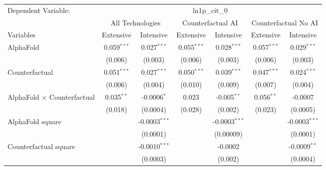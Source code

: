 \begingroup
\centering
\begin{tabular}{lcccccc}
   \tabularnewline \midrule \midrule
   Dependent Variable: & \multicolumn{6}{c}{ln1p\_cit\_0}\\
 & \multicolumn{2}{c}{All Technologies} & \multicolumn{2}{c}{Counterfactual AI} & \multicolumn{2}{c}{Counterfactual No AI} \\
\cmidrule(lr){1-1}\cmidrule(lr){2-3} \cmidrule(lr){4-5} \cmidrule(lr){6-7}
Variables & \multicolumn{1}{c}{Extensive} & \multicolumn{1}{c}{Intensive} & \multicolumn{1}{c}{Extensive} & \multicolumn{1}{c}{Intensive} & \multicolumn{1}{c}{Extensive} & \multicolumn{1}{c}{Intensive} \\
\cmidrule(lr){1-1}\cmidrule(lr){2-2} \cmidrule(lr){3-3} \cmidrule(lr){4-4} \cmidrule(lr){5-5} \cmidrule(lr){6-6} \cmidrule(lr){7-7}
   AlphaFold                          & 0.059$^{***}$ & 0.027$^{***}$     & 0.055$^{***}$ & 0.028$^{***}$   & 0.057$^{***}$ & 0.029$^{***}$\\   
                                      & (0.006)       & (0.003)           & (0.006)       & (0.003)         & (0.006)       & (0.003)\\   
   Counterfactual                     & 0.051$^{***}$ & 0.027$^{***}$     & 0.050$^{***}$ & 0.039$^{***}$   & 0.047$^{***}$ & 0.024$^{***}$\\   
                                      & (0.006)       & (0.004)           & (0.010)       & (0.009)         & (0.007)       & (0.004)\\   
   AlphaFold $\times$ Counterfactual  & 0.035$^{**}$  & -0.0006$^{*}$     & 0.023         & -0.005$^{**}$   & 0.056$^{**}$  & -0.0007\\   
                                      & (0.018)       & (0.0004)          & (0.028)       & (0.002)         & (0.023)       & (0.0005)\\   
   AlphaFold square                   &               & -0.0003$^{***}$   &               & -0.0003$^{***}$ &               & -0.0003$^{***}$\\   
                                      &               & (0.0001)          &               & (0.00009)       &               & (0.0001)\\   
   Counterfactual square              &               & -0.0010$^{***}$   &               & -0.0002         &               & -0.0009$^{**}$\\   
                                      &               & (0.0003)          &               & (0.002)         &               & (0.0004)\\   

\end{tabular}
